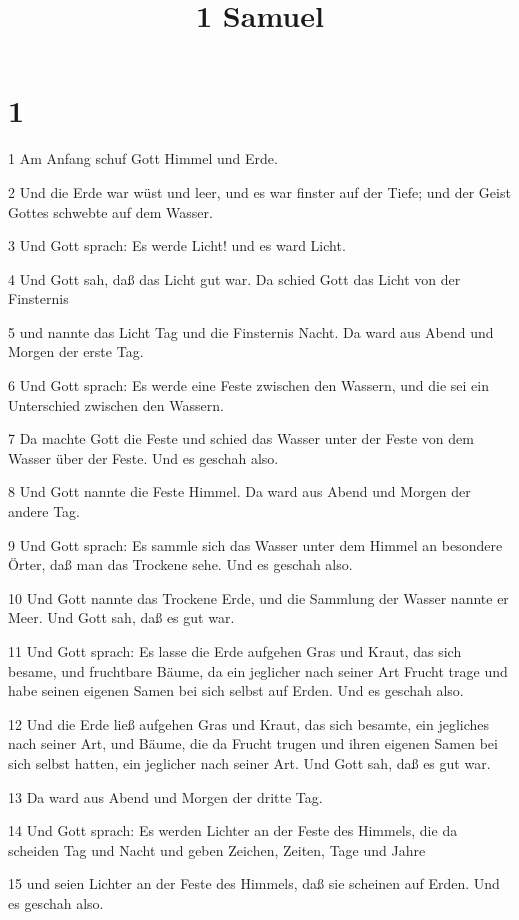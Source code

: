 

\title{1 Samuel}


\chapter{1}

\par 1 Am Anfang schuf Gott Himmel und Erde.
\par 2 Und die Erde war wüst und leer, und es war finster auf der Tiefe; und der Geist Gottes schwebte auf dem Wasser.
\par 3 Und Gott sprach: Es werde Licht! und es ward Licht.
\par 4 Und Gott sah, daß das Licht gut war. Da schied Gott das Licht von der Finsternis
\par 5 und nannte das Licht Tag und die Finsternis Nacht. Da ward aus Abend und Morgen der erste Tag.
\par 6 Und Gott sprach: Es werde eine Feste zwischen den Wassern, und die sei ein Unterschied zwischen den Wassern.
\par 7 Da machte Gott die Feste und schied das Wasser unter der Feste von dem Wasser über der Feste. Und es geschah also.
\par 8 Und Gott nannte die Feste Himmel. Da ward aus Abend und Morgen der andere Tag.
\par 9 Und Gott sprach: Es sammle sich das Wasser unter dem Himmel an besondere Örter, daß man das Trockene sehe. Und es geschah also.
\par 10 Und Gott nannte das Trockene Erde, und die Sammlung der Wasser nannte er Meer. Und Gott sah, daß es gut war.
\par 11 Und Gott sprach: Es lasse die Erde aufgehen Gras und Kraut, das sich besame, und fruchtbare Bäume, da ein jeglicher nach seiner Art Frucht trage und habe seinen eigenen Samen bei sich selbst auf Erden. Und es geschah also.
\par 12 Und die Erde ließ aufgehen Gras und Kraut, das sich besamte, ein jegliches nach seiner Art, und Bäume, die da Frucht trugen und ihren eigenen Samen bei sich selbst hatten, ein jeglicher nach seiner Art. Und Gott sah, daß es gut war.
\par 13 Da ward aus Abend und Morgen der dritte Tag.
\par 14 Und Gott sprach: Es werden Lichter an der Feste des Himmels, die da scheiden Tag und Nacht und geben Zeichen, Zeiten, Tage und Jahre
\par 15 und seien Lichter an der Feste des Himmels, daß sie scheinen auf Erden. Und es geschah also.
